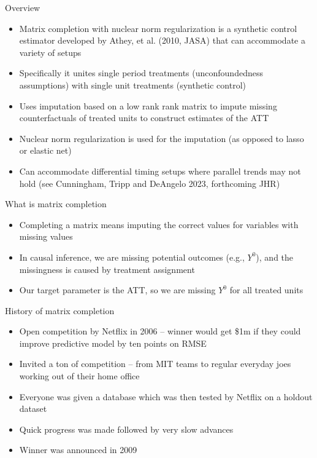 \documentclass{beamer}
\begin{document}
\begin{frame}{Overview}

\begin{itemize}
\item Matrix completion with nuclear norm regularization is a synthetic control estimator developed by Athey, et al. (2010, JASA) that can accommodate a variety of setups
\item Specifically it unites single period treatments (unconfoundedness assumptions) with single unit treatments (synthetic control)
\item Uses imputation based on a low rank rank matrix to impute missing counterfactuals of treated units to construct estimates of the ATT
\item Nuclear norm regularization is used for the imputation (as opposed to lasso or elastic net)
\item Can accommodate differential timing setups where parallel trends may not hold (see Cunningham, Tripp and DeAngelo 2023, forthcoming JHR)
\end{itemize}

\end{frame}

\begin{frame}{What is matrix completion}

\begin{itemize}
\item Completing a matrix means imputing the correct values for variables with missing values
\item In causal inference, we are missing potential outcomes (e.g., $Y^0$), and the missingness is caused by treatment assignment
\item Our target parameter is the ATT, so we are missing $Y^0$ for all treated units
\end{itemize}
\end{frame}

\begin{frame}{History of matrix completion}

\begin{itemize}
\item Open competition by Netflix in 2006 -- winner would get \$1m if they could improve predictive model by ten points on RMSE
\item Invited a ton of competition -- from MIT teams to regular everyday joes working out of their home office
\item Everyone was given a database which was then tested by Netflix on a holdout dataset
\item Quick progress was made followed by very slow advances
\item Winner was announced in 2009
\end{itemize}

\end{frame}
\end{document}
